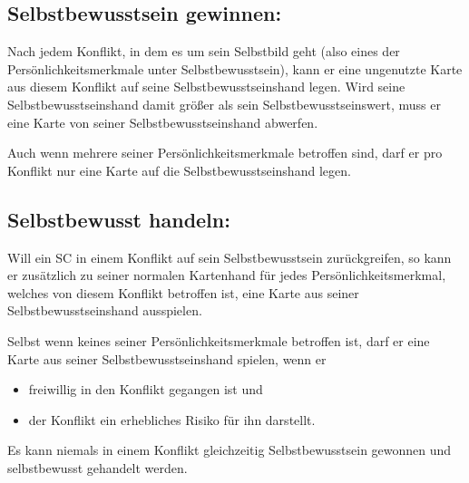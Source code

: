 \subsection{Selbstbewusstsein gewinnen:}
Nach jedem Konflikt, in dem es um sein Selbstbild geht (also eines der Persönlichkeitsmerkmale unter Selbstbewusstsein), kann er eine ungenutzte Karte aus diesem Konflikt auf seine Selbstbewusstseinshand legen. Wird seine Selbstbewusstseinshand damit größer als sein Selbstbewusstseinswert, muss er eine Karte von seiner Selbstbewusstseinshand abwerfen.

Auch wenn mehrere seiner Persönlichkeitsmerkmale betroffen sind, darf er pro Konflikt nur eine Karte auf die Selbstbewusstseinshand legen.

\subsection{Selbstbewusst handeln:}
Will ein SC in einem Konflikt auf sein Selbstbewusstsein zurückgreifen, so kann er zusätzlich zu seiner normalen Kartenhand für jedes Persönlichkeitsmerkmal, welches von diesem Konflikt betroffen ist, eine Karte aus seiner Selbstbewusstseinshand ausspielen.

Selbst wenn keines seiner Persönlichkeitsmerkmale betroffen ist, darf er eine Karte aus seiner Selbstbewusstseinshand spielen, wenn er
\begin{itemize}
\item freiwillig in den Konflikt gegangen ist und
\item der Konflikt ein erhebliches Risiko für ihn darstellt.
\end{itemize}
Es kann niemals in einem Konflikt gleichzeitig Selbstbewusstsein gewonnen und selbstbewusst gehandelt werden.
